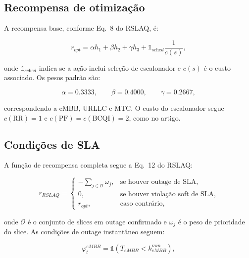 \documentclass[10pt,a4paper]{IEEEtran}
\begin{document}
\subsection{Recompensa de otimiza\c{c}\~{a}o}

A recompensa base, conforme Eq.~8 do RSLAQ, \'{e}:

\begin{equation}
r_{\textit{opt}} = \alpha h_1 + \beta h_2 + \gamma h_3
                 + \mathbb{1}_{\textit{sched}}\frac{1}{c(s)},
\label{eq:ropt}
\end{equation}

onde $\mathbb{1}_{\textit{sched}}$ indica se a a\c{c}\~{a}o
inclui sele\c{c}\~{a}o de escalonador e $c(s)$ \'{e} o custo
associado. Os pesos padr\~{a}o s\~{a}o:

\begin{equation}
\alpha=0.3333,\qquad \beta=0.4000,\qquad \gamma=0.2667,
\label{eq:weights}
\end{equation}

correspondendo a eMBB, URLLC e MTC. O custo do escalonador
segue $c(\text{RR})=1$ e $c(\text{PF})=c(\text{BCQI})=2$, como
no artigo.

\subsection{Condi\c{c}\~{o}es de SLA}

A fun\c{c}\~{a}o de recompensa completa segue a Eq.~12 do RSLAQ:

\begin{equation}
r_{\textit{RSLAQ}} =
\begin{cases}
-\sum_{j\in\mathcal{O}}\omega_j, & \text{se houver outage de SLA},\\[4pt]
0, & \text{se houver viola\c{c}\~{a}o soft de SLA},\\[4pt]
r_{\textit{opt}}, & \text{caso contr\'{a}rio},
\end{cases}
\label{eq:rslaq_reward}
\end{equation}

onde $\mathcal{O}$ \'{e} o conjunto de slices em outage
confirmado e $\omega_j$ \'{e} o peso de prioridade do slice.
As condi\c{c}\~{o}es de outage instant\^{a}neo seguem:

\begin{equation}
\varphi^{\textit{eMBB}}_t = \mathbb{1}\!\left(
T_{\textit{eMBB}} < k^{\textit{min}}_{\textit{eMBB}}\right),
\label{eq:outage_embb}
\end{equation}
\end{document}
